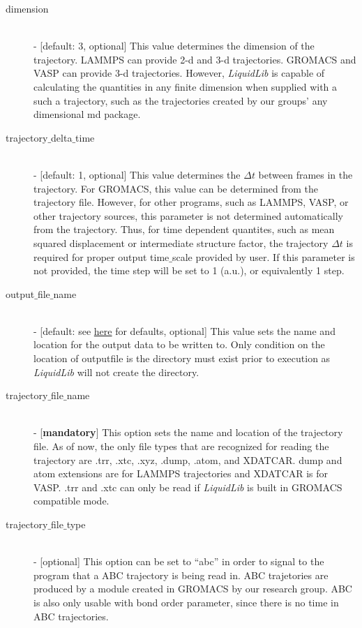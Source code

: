 \documentclass{article}
\begin{document}
\begin{description}
	\item[dimension] \hfill \\
	- [default: 3, optional] This value determines the dimension of the trajectory.  LAMMPS can provide 2-d and 3-d trajectories.  GROMACS and VASP can provide 3-d trajectories.  However, \textit{LiquidLib} is capable of calculating the quantities in any finite dimension when supplied with a such a trajectory, such as the trajectories created by our groups' any dimensional md package. 
	
	\item[trajectory$\_$delta$\_$time] \hfill \\
	- [default: 1, optional] This value determines the $\Delta t$ between frames in the trajectory.  For GROMACS, this value can be determined from the trajectory file.  However, for other programs, such as LAMMPS, VASP, or other trajectory sources, this parameter is not determined automatically from the trajectory.  Thus, for time dependent quantites, such as mean squared displacement or intermediate structure factor, the trajectory $\Delta t$ is required for proper output time$\_$scale provided by user.  If this parameter is not provided, the time step will be set to 1 (a.u.), or equivalently 1 step. 
	
	\item[output$\_$file$\_$name] \hfill \\
	- [default: see \hyperref[input_output]{here} for defaults, optional] This value sets the name and location for the output data to be written to.  Only condition on the location of outputfile is the directory must exist prior to execution as \textit{LiquidLib} will not create the directory.
	
	\item[trajectory$\_$file$\_$name] \hfill \\
	- [\textbf{mandatory}] This option sets the name and location of the trajectory file.  As of now, the only file types that are recognized for reading the trajectory are .trr, .xtc, .xyz, .dump, .atom, and XDATCAR.  dump and atom extensions are for LAMMPS trajectories and XDATCAR is for VASP.  .trr and .xtc can only be read if \textit{LiquidLib} is built in GROMACS compatible mode.
	
	\item[trajectory$\_$file$\_$type] \hfill \\
	- [optional] This option can be set to ``abc'' in order to signal to the program that a ABC trajectory is being read in.  ABC trajetories are produced by a module created in GROMACS by our research group.  ABC is also only usable with bond order parameter, since there is no time in ABC trajectories.
	

\end{description}
\end{document}
